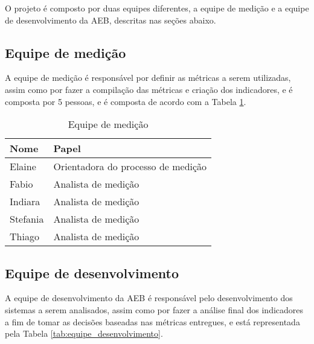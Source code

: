 O projeto é composto por duas equipes diferentes, a equipe de medição e a equipe de desenvolvimento da AEB, descritas nas seções abaixo.

\subsection{Equipe de medição}

A equipe de medição é responsável por definir as métricas a serem utilizadas, assim como por fazer a compilação das métricas e criação dos indicadores, e é composta por 5 pessoas, e é composta de acordo com a Tabela \ref{tab:equipe_medicao}.

\begin{table}[H]
\centering
\begin{tabular}{|p{2cm}|p{5cm}|}
\hline
	\textbf{Nome} &
	\textbf{Papel}
	\\ \hline
	Elaine &
	Orientadora do processo de medição
	\\ \hline
	Fabio &
	Analista de medição
	\\ \hline
	Indiara &
	Analista de medição
	\\ \hline
	Stefania &
	Analista de medição
	\\ \hline
	Thiago &
	Analista de medição
	\\ \hline
\end{tabular}
\caption{Equipe de medição}
\label{tab:equipe_medicao}
\end{table}

\subsection{Equipe de desenvolvimento}

A equipe de desenvolvimento da AEB é responsável pelo desenvolvimento dos sistemas a serem analisados, assim como por fazer a análise final dos indicadores a fim de tomar as decisões baseadas nas métricas entregues, e está representada pela Tabela \ref{tab:equipe_desenvolvimento}.


